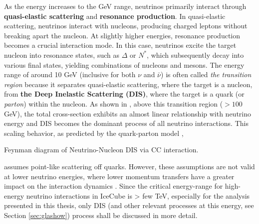 As the energy increases to the GeV range, neutrinos primarily interact through \textbf{quasi-elastic scattering} and \textbf{resonance production}. In quasi-elastic scattering, neutrinos interact with nucleons, producing charged leptons without breaking apart the nucleon. At slightly higher energies, resonance production becomes a crucial interaction mode. In this case, neutrinos excite the target nucleon into resonance states, such as $\Delta$ or $N^*$, which subsequently decay into various final states, yielding combinations of nucleons and mesons. The energy range of around 10 GeV (inclusive for both $\nu$ and $\bar{\nu}$) is often called \emph{the transition region} because it separates quasi-elastic scattering, where the target is a nucleon, from \textbf{ the Deep Inelastic Scattering (DIS)}, where the target is a quark (or \emph{parton}) within the nucleon. As shown in , above this transition region ($> 100$ GeV), the total cross-section exhibits an almost linear relationship with neutrino energy and DIS becomes the dominant process of all neutrino interactions. This scaling behavior, as predicted by the quark-parton model ,\begin{marginfigure}
        \centering
        \caption[Feynman diagram of Neutrino-Nucleon DIS via CC interaction]{Feynman diagram of Neutrino-Nucleon DIS via CC interaction.}
        \end{marginfigure}  assumes point-like scattering off quarks. However, these assumptions are not valid at lower neutrino energies, where lower momentum transfers have a greater impact on the interaction dynamics . Since the critical energy-range for high-energy neutrino interactions in IceCube is > few TeV, especially for the analysis presented in this thesis, only DIS (and other relevant processes at this energy, see Section \ref{sec:glashow}) process shall be discussed in more detail. 

